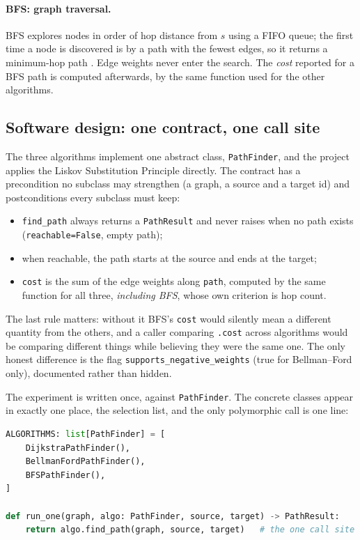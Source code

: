 \documentclass[11pt,a4paper]{article}
\begin{document}
\paragraph{BFS: graph traversal.}
BFS explores nodes in order of hop distance from $s$ using a FIFO queue; the first time a
node is discovered is by a path with the fewest edges, so it returns a minimum-hop path
\cite{moore1959}. Edge weights never enter the search. The \emph{cost} reported for a BFS
path is computed afterwards, by the same function used for the other algorithms.

\subsection{Software design: one contract, one call site}
\label{sec:lsp}

The three algorithms implement one abstract class, \texttt{PathFinder}, and the project
applies the Liskov Substitution Principle \cite{liskov1994} directly. The contract has
a precondition no subclass may strengthen (a graph, a source and a target id) and
postconditions every subclass must keep:
\begin{itemize}
  \item \texttt{find\_path} always returns a \texttt{PathResult} and never raises when no
        path exists (\texttt{reachable=False}, empty path);
  \item when reachable, the path starts at the source and ends at the target;
  \item \texttt{cost} is the sum of the edge weights along \texttt{path}, computed by the
        same function for all three, \emph{including BFS}, whose own criterion is hop count.
\end{itemize}
The last rule matters: without it BFS's \texttt{cost} would silently mean a different
quantity from the others, and a caller comparing \texttt{.cost} across algorithms would be
comparing different things while believing they were the same one. The only honest
difference is the flag \texttt{supports\_negative\_weights} (true for Bellman--Ford only),
documented rather than hidden.

The experiment is written once, against \texttt{PathFinder}. The concrete classes appear in
exactly one place, the selection list, and the only polymorphic call is one line:

\begin{lstlisting}[language=Python, caption={The single selection point and the single polymorphic call, from \texttt{experiment.py}.}, label={lst:callsite}]
ALGORITHMS: list[PathFinder] = [
    DijkstraPathFinder(),
    BellmanFordPathFinder(),
    BFSPathFinder(),
]

def run_one(graph, algo: PathFinder, source, target) -> PathResult:
    return algo.find_path(graph, source, target)   # the one call site
\end{lstlisting}
\end{document}
